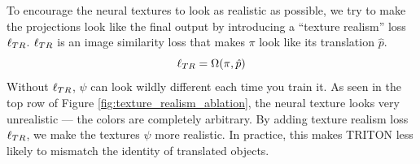 \documentclass{article}
\begin{document}
		To encourage the neural textures to look as realistic as possible, we try to make the projections look like the final output by introducing a ``texture realism'' loss $\ell_{TR}$. 
		$\ell_{TR}$ is an image similarity loss that makes $\pi$ look like its translation $\hat{p}$.
		\begin{equation}
			\ell_{TR} = \Omega(\pi,\hat{p})
		\end{equation}
		Without $\ell_{TR}$, $\psi$ can look wildly different each time you train it.
		As seen in the top row of Figure \ref{fig:texture_realism_ablation}, the neural texture looks very unrealistic --- the colors are completely arbitrary.
        By adding texture realism loss $\ell_{TR}$, we make the textures $\psi$ more realistic. In practice, this makes TRITON less likely to mismatch the identity of translated objects.
\end{document}
